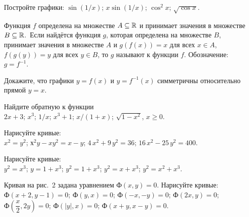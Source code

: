 \documentclass[a4paper,12pt]{article}
\begin{document}
\vspace*{-5.2truemm}


Постройте графики:
 $\sin(1/x)$;
 $x\sin(1/x)$;
 $\cos^2x$;
 $\sqrt{\cos x}$.


Функция $f$ определена на множестве $A\subseteq\mathbb{R}$
и принимает значения в множестве $B\subseteq\mathbb{R}$.~Если
найд\"ется функция $g$,
которая определена на множестве $B$,
принимает значения в множестве $A$ и
$g(f(x))=x$ для всех $x\in A$, $f(g(y))=y$ для всех $y\in B$, то
$g$ называют  к функции $f$.
Обозначение: $g=f^{-1}$.

Докажите, что графики $y=f(x)$  и $y=f^{-1}(x)$ симметричны
относительно прямой $y=x$.

Найдите обратную к функции\\
\hskip-3pt $2x+3$; \hskip-3pt
\hskip-3pt $x^3$; \hskip-3pt
\hskip-3pt $1/x$; \hskip-3pt
\hskip-3pt $x^3+1$; \hskip-3pt
\hskip-3pt $x/(1+x)$; \hskip-3pt
\hskip-3pt $\sqrt{1-x^2}$, $x\geq0$. %











 Нарисуйте кривые:\\
 $x^2=y^2$;
 $х^2y-xy^2=x-y$;
 $4\,x^2+9\,y^2=36$;
 $16\,x^2-25\,y^2=400$.

 Нарисуйте кривые:\\
 $y^2=x^3$;
 $y=1+x^3$;
 $y^2=1+x^3$;
 $y^2=x+x^3$;
 $y^2=x^2+x^3$.

Кривая на рис.~2 задана уравнением $Ф(x,y)=0$.
Нарисуйте %
кривые:\\
   $Ф(x+2,y-1)=0$;
   $Ф(y,x)=0$;
   $Ф(-x,-y)=0$;
   $Ф(2x,y)=0$;\\
   $Ф\left(\dfrac x2,2y\right)=0$;
   $Ф(|y|,x)=0$;
   $Ф(x+y, x-y)=0$.
\end{document}
